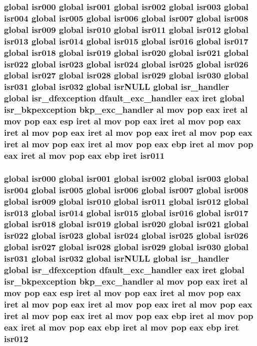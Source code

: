 \subsubsection[{\texorpdfstring{isr011}{isr011}}]{\setlength{\rightskip}{0pt plus 5cm}global {\bf isr000} global {\bf isr001} global {\bf isr002} global {\bf isr003} global {\bf isr004} global {\bf isr005} global {\bf isr006} global {\bf isr007} global {\bf isr008} global {\bf isr009} global {\bf isr010} global isr011 global {\bf isr012} global {\bf isr013} global {\bf isr014} global {\bf isr015} global {\bf isr016} global {\bf isr017} global {\bf isr018} global {\bf isr019} global {\bf isr020} global {\bf isr021} global {\bf isr022} global {\bf isr023} global {\bf isr024} global {\bf isr025} global {\bf isr026} global {\bf isr027} global {\bf isr028} global {\bf isr029} global {\bf isr030} global {\bf isr031} global isr032 global isr\+N\+U\+LL global isr\+\_\+handler global {\bf isr\+\_\+dfexception} {\bf dfault\+\_\+exc\+\_\+handler} eax iret global {\bf isr\+\_\+bkpexception} {\bf bkp\+\_\+exc\+\_\+handler} {\bf al} {\bf mov} pop eax iret {\bf al} {\bf mov} pop eax esp iret {\bf al} {\bf mov} pop eax iret {\bf al} {\bf mov} pop eax iret {\bf al} {\bf mov} pop eax iret {\bf al} {\bf mov} pop eax iret {\bf al} {\bf mov} pop eax iret {\bf al} {\bf mov} pop eax iret {\bf al} {\bf mov} pop eax ebp iret {\bf al} {\bf mov} pop eax iret {\bf al} {\bf mov} pop eax ebp iret isr011}\hypertarget{isrs_8as_a4c9e27b9224bd201f4bcd05e3b7c99c0}{}\label{isrs_8as_a4c9e27b9224bd201f4bcd05e3b7c99c0}
\subsubsection[{\texorpdfstring{isr012}{isr012}}]{\setlength{\rightskip}{0pt plus 5cm}global {\bf isr000} global {\bf isr001} global {\bf isr002} global {\bf isr003} global {\bf isr004} global {\bf isr005} global {\bf isr006} global {\bf isr007} global {\bf isr008} global {\bf isr009} global {\bf isr010} global {\bf isr011} global isr012 global {\bf isr013} global {\bf isr014} global {\bf isr015} global {\bf isr016} global {\bf isr017} global {\bf isr018} global {\bf isr019} global {\bf isr020} global {\bf isr021} global {\bf isr022} global {\bf isr023} global {\bf isr024} global {\bf isr025} global {\bf isr026} global {\bf isr027} global {\bf isr028} global {\bf isr029} global {\bf isr030} global {\bf isr031} global isr032 global isr\+N\+U\+LL global isr\+\_\+handler global {\bf isr\+\_\+dfexception} {\bf dfault\+\_\+exc\+\_\+handler} eax iret global {\bf isr\+\_\+bkpexception} {\bf bkp\+\_\+exc\+\_\+handler} {\bf al} {\bf mov} pop eax iret {\bf al} {\bf mov} pop eax esp iret {\bf al} {\bf mov} pop eax iret {\bf al} {\bf mov} pop eax iret {\bf al} {\bf mov} pop eax iret {\bf al} {\bf mov} pop eax iret {\bf al} {\bf mov} pop eax iret {\bf al} {\bf mov} pop eax iret {\bf al} {\bf mov} pop eax ebp iret {\bf al} {\bf mov} pop eax iret {\bf al} {\bf mov} pop eax ebp iret {\bf al} {\bf mov} pop eax ebp iret isr012}\hypertarget{isrs_8as_ad7952fd7b624fde5f4318d059b29a5fe}{}\label{isrs_8as_ad7952fd7b624fde5f4318d059b29a5fe}
